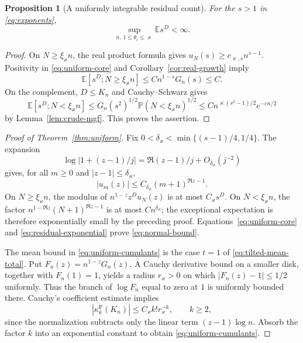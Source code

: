 \documentclass[11pt]{article}
\numberwithin{equation}{section}
\newtheorem{proposition}[theorem]{Proposition}
\theoremstyle{definition}
\theoremstyle{remark}
\newcommand{\E}{\mathbb E}
\newcommand{\Pp}{\mathbb P}
\newcommand{\abs}[1]{\left|#1\right|}
\begin{document}
\begin{proposition}[A uniformly integrable residual count]\label{prop:residual-mgf}
For the $s>1$ in \eqref{eq:exponents},
\begin{equation}\label{eq:residual-exponential}
 \sup_{n,\,1\le\theta_i\le\varkappa}\E s^D<\infty.
\end{equation}
\end{proposition}
\begin{proof}
On $N\ge\xi_{\varkappa}n$, the real product formula gives $u_N(s)\ge c_{\varkappa,s}n^{s-1}$. Positivity in \eqref{eq:uniform-core} and Corollary~\ref{cor:real-growth} imply
\[
 \E[s^D;N\ge\xi_{\varkappa}n]\le C n^{1-s}G_n(s)\le C.
\]
On the complement, $D\le K_n$ and Cauchy--Schwarz gives
\[
 \E[s^D;N<\xi_{\varkappa}n]\le G_n(s^2)^{1/2}\Pp(N<\xi_{\varkappa}n)^{1/2}
 \le C n^{\varkappa(s^2-1)/2}e^{-cn/2}
\]
by Lemma~\ref{lem:crude-mgf}. This proves the assertion.
\end{proof}

\begin{proof}[Proof of Theorem~\ref{thm:uniform}]
Fix $0<\delta_\varkappa<\min\{(s-1)/4,1/4\}$. The expansion
\[
 \log\abs{1+(z-1)/j}=\Re(z-1)/j+O_{\delta_\varkappa}(j^{-2})
\]
gives, for all $m\ge0$ and $|z-1|\le\delta_\varkappa$,
\begin{equation}\label{eq:uniform-complex-bound}
 |u_m(z)|\le C_{\delta_\varkappa}(m+1)^{\Re z-1}.
\end{equation}
On $N\ge\xi_{\varkappa}n$, the modulus of $n^{1-z}z^D u_N(z)$ is at most $C_\varkappa s^D$. On $N<\xi_{\varkappa}n$, the factor $n^{1-\Re z}(N+1)^{\Re z-1}$ is at most $C n^{\delta_\varkappa}$; the exceptional expectation is therefore exponentially small by the preceding proof. Equations~\eqref{eq:uniform-core} and \eqref{eq:residual-exponential} prove \eqref{eq:normal-bound}.

The mean bound in \eqref{eq:uniform-cumulants} is the case $t=1$ of \eqref{eq:tilted-mean-total}. Put $F_n(z)=n^{1-z}G_n(z)$. A Cauchy derivative bound on a smaller disk, together with $F_n(1)=1$, yields a radius $r_\varkappa>0$ on which $|F_n(z)-1|\le1/2$ uniformly. Thus the branch of $\log F_n$ equal to zero at $1$ is uniformly bounded there. Cauchy's coefficient estimate implies
\[
 |\kappa_k^{\mathrm F}(K_n)|\le C_\varkappa k!r_\varkappa^{-k},\qquad k\ge2,
\]
since the normalization subtracts only the linear term $(z-1)\log n$. Absorb the factor $k$ into an exponential constant to obtain \eqref{eq:uniform-cumulants}.
\end{proof}
\end{document}
